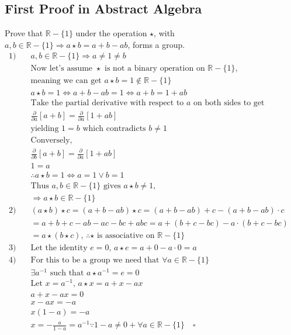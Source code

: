 \documentclass{article}
\begin{document}
\subsection*{First Proof in Abstract Algebra}
Prove that \( \mathbb{R} - \{1\} \) under the operation \(\star\), 
with \(a,b \in \mathbb{R} - \{1\} \Rightarrow a \star b = a+b-ab\),
forms a group.
\begin{align*} 
  1) \quad & a,b \in \mathbb{R} - \{1\} \Rightarrow a \neq 1 \neq b & \\
           & \text{Now let's assume } \star \text{ is not a binary operation on } \mathbb{R} - \{1\} \text{,}   & \\
           & \text{meaning we can get } a \star b = 1 \notin \mathbb{R} - \{1\} & \\
     & a \star b = 1 \Leftrightarrow a+b-ab = 1 \Leftrightarrow a+b = 1 + ab&\\
     & \text{Take the partial derivative with respect to } a \text{ on both sides to get} &\\
     & \frac{\partial}{\partial{a}} [a+b] = \frac{\partial}{\partial{a}} [1 + ab]  & \\
     & \text{yielding } 1 = b \text{ which contradicts } b \neq 1 & \\
     & \text{Conversely, } & \\
     & \frac{\partial}{\partial{b}} [a+b] = \frac{\partial}{\partial{a}}[1+ab] & \\
     & 1 = a & \\
     & \therefore a \star b = 1 \Leftrightarrow a = 1 \lor b = 1 & \\
     & \text{Thus } a,b \in \mathbb{R} - \{1\} \text{ gives } a \star b \neq 1 \text{,} &\\
     & \Rightarrow a \star b \in \mathbb{R} - \{1\}& \\
  2) \quad  & (a \star b) \star c = (a+b - ab) \star c = (a+b-ab) + c - (a+b-ab) \cdot c & \\
     & = a + b + c - ab - ac - bc + abc = a + (b + c - bc) - a \cdot (b + c -bc) & \\
     & = a \star (b \star c) \text{, } \therefore \star \text{ is associative on } \mathbb{R} - \{1\} & \\
  3) \quad & \text{Let the identity } e = 0 \text{, } a \star e = a+0 - a \cdot 0 = a & \\
  4) \quad & \text{For this to be a group we need that } \forall a \in \mathbb{R} - \{1\} & \\
           & \exists a^{-1} \text{ such that } a \star a^{-1} = e = 0 & \\
           & \text{Let } x = a^{-1} \text{, } a \star x = a+x-ax & \\
           & a+x-ax = 0 & \\
           & x - ax = -a & \\
           & x (1-a) = -a & \\
           & x = - \frac{a}{1-a} = a^{-1} \because 1-a \neq 0 +\forall a \in \mathbb{R} - \{1\} \quad \square & \\
\end{align*}
\end{document}
